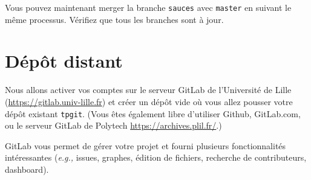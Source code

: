 \documentclass[final, a4paper, openbib, ]{article}
\begin{document}
Vous pouvez maintenant merger la branche \texttt{sauces} avec \texttt{master} en suivant le même processus.
Vérifiez que tous les branches sont à jour.

\section{Dépôt distant}


Nous allons activer vos comptes sur le serveur GitLab de l'Université de Lille (\url{https://gitlab.univ-lille.fr}) et créer un dépôt vide où vous allez pousser votre dépôt existant \texttt{tpgit}. (Vous êtes également libre d'utiliser Github, GitLab.com, ou le serveur GitLab de Polytech \url{https://archives.plil.fr/}.)

GitLab vous permet de gérer votre projet et fourni plusieurs fonctionnalités intéressantes (\textit{e.g.,} issues, graphes, édition de fichiers, recherche de contributeurs, dashboard).\\


\end{document}
